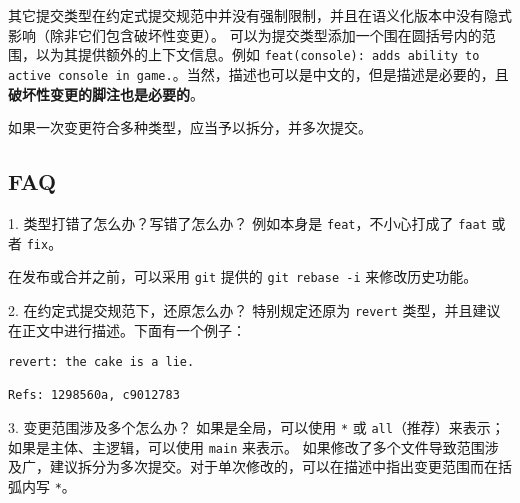 其它提交类型在约定式提交规范中并没有强制限制，并且在语义化版本中没有隐式影响（除非它们包含破坏性变更）。 可以为提交类型添加一个围在圆括号内的范围，以为其提供额外的上下文信息。例如 \verb`feat(console): adds ability to active console in game.`。当然，描述也可以是中文的，但是描述是必要的，且\textbf{破坏性变更的脚注也是必要的}。

如果一次变更符合多种类型，应当予以拆分，并多次提交。

\subsection{FAQ}
1. 类型打错了怎么办？写错了怎么办？
例如本身是 \verb`feat`，不小心打成了 \verb`faat` 或者 \verb`fix`。

在发布或合并之前，可以采用 \verb`git` 提供的 \verb`git rebase -i` 来修改历史功能。

2. 在约定式提交规范下，还原怎么办？
特别规定还原为 \verb`revert` 类型，并且建议在正文中进行描述。下面有一个例子：
\begin{lstlisting}[language=none]
revert: the cake is a lie.

Refs: 1298560a, c9012783
\end{lstlisting}

3. 变更范围涉及多个怎么办？
如果是全局，可以使用 \verb`*` 或 \verb`all`（推荐）来表示；如果是主体、主逻辑，可以使用 \verb`main` 来表示。
如果修改了多个文件导致范围涉及广，建议拆分为多次提交。对于单次修改的，可以在描述中指出变更范围而在括弧内写 \verb`*`。